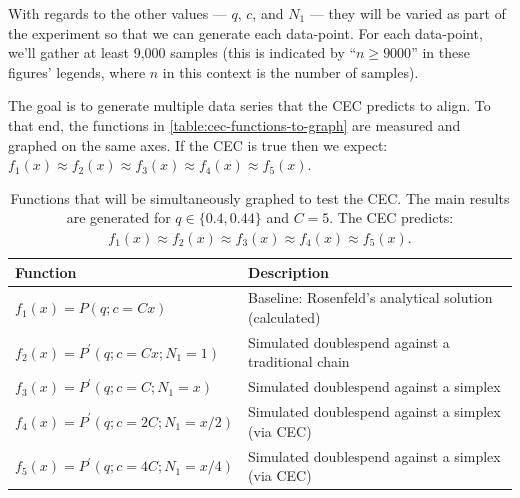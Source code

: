 With regards to the other values --- $q$, $c$, and $N_1$ --- they will be varied as part of the experiment so that we can generate each data-point.
For each data-point, we'll gather at least 9,000 samples (this is indicated by ``$n \ge 9000$'' in these figures' legends, where $n$ in this context is the number of samples).

The goal is to generate multiple data series that the CEC predicts to align.
To that end, the functions in \autoref{table:cec-functions-to-graph} are measured and graphed on the same axes.
If the CEC is true then we expect: $f_1(x) \approx f_2(x) \approx f_3(x) \approx f_4(x) \approx f_5(x)$.
\begin{table}[H]
    \centering
    \caption[
        Functions that will be simultaneously graphed to test the CEC.
    ]{
        Functions that will be simultaneously graphed to test the CEC.
        The main results are generated for $q \in \{0.4, 0.44\}$ and $C = 5$.
        The CEC predicts: $f_1(x) \approx f_2(x) \approx f_3(x) \approx f_4(x) \approx f_5(x)$.
    }
    \label{table:cec-functions-to-graph}
    \begin{tabular}{ll}
        \toprule
        Function & Description \\
        \midrule
        $f_1(x) = P(q; c = Cx)$ & Baseline: Rosenfeld's analytical solution (calculated) \\
        $f_2(x) = P^\prime(q; c = Cx; N_1 = 1)$ & Simulated doublespend against a traditional chain \\
        $f_3(x) = P^\prime(q; c = C; N_1 = x)$ & Simulated doublespend against a simplex \\
        $f_4(x) = P^\prime(q; c = 2C; N_1 = x/2)$ & Simulated doublespend against a simplex (via CEC) \\
        $f_5(x) = P^\prime(q; c = 4C; N_1 = x/4)$ & Simulated doublespend against a simplex (via CEC) \\
        \bottomrule
    \end{tabular}
\end{table}




